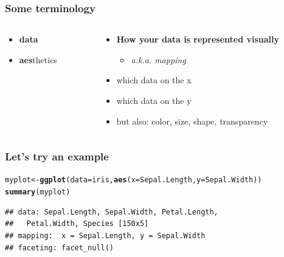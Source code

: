 \documentclass{beamer}\usepackage[]{graphicx}\usepackage[]{color}
\makeatletter
\newcommand{\hlkwd}[1]{\textcolor[rgb]{0.737,0.353,0.396}{\textbf{#1}}}%
\newenvironment{kframe}{%
 \def\at@end@of@kframe{}%
 \ifinner\ifhmode%
  \def\at@end@of@kframe{\end{minipage}}%
  \begin{minipage}{\columnwidth}%
 \fi\fi%
 \def\FrameCommand##1{\hskip\@totalleftmargin \hskip-\fboxsep
 \colorbox{shadecolor}{##1}\hskip-\fboxsep
     \hskip-\linewidth \hskip-\@totalleftmargin \hskip\columnwidth}%
 \MakeFramed {\advance\hsize-\width
   \@totalleftmargin\z@ \linewidth\hsize
   \@setminipage}}%
 {\par\unskip\endMakeFramed%
 \at@end@of@kframe}
\newenvironment{knitrout}{}{} %
\makeatother
\begin{document}
\begin{frame}[fragile]
\frametitle{Some terminology}
\begin{columns}[t]

\begin{column}[T]{3cm}
\begin{itemize}
    \item \textbf{\color{gray}data}
    \item \textbf{aes}thetics
\end{itemize}
\end{column}

\begin{column}[T]{8cm}
\begin{itemize}
    \item \textbf{How your data is represented visually}
        \begin{itemize}
        \item \emph{a.k.a. mapping}
        \end{itemize}
    \item which data on the x
    \item which data on the y
    \item but also: {\color{red}color}, {\LARGE{size}}, shape, transparency
\end{itemize}
\end{column}

\end{columns}
\end{frame}


\begin{frame}[fragile]
\frametitle{Let's try an example}
\begin{knitrout}\footnotesize
{}\color{fgcolor}\begin{kframe}
\begin{alltt}
myplot <- \hlkwd{ggplot}(data = iris, \hlkwd{aes}(x = Sepal.Length, y = Sepal.Width))
\hlkwd{summary}(myplot)
\end{alltt}
\begin{verbatim}
## data: Sepal.Length, Sepal.Width, Petal.Length,
##   Petal.Width, Species [150x5]
## mapping:  x = Sepal.Length, y = Sepal.Width
## faceting: facet_null()
\end{verbatim}
\end{kframe}
\end{knitrout}

\end{frame}
\end{document}
